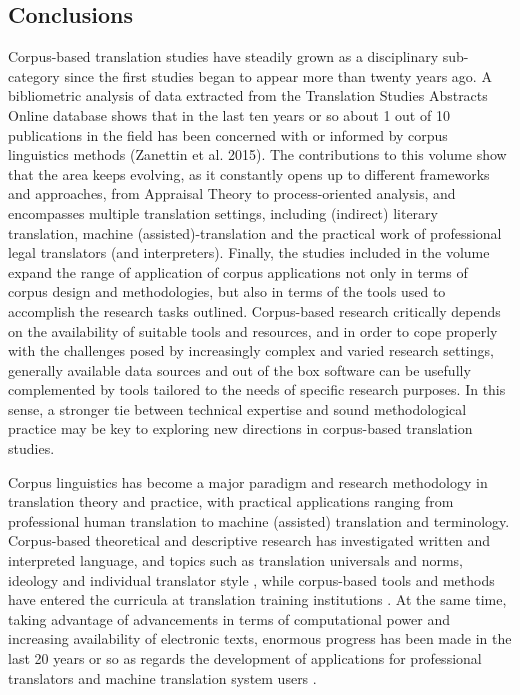 \begin{refsection}
\section{Conclusions}
Corpus-based translation studies have steadily grown as a disciplinary sub-category since the first studies began to appear more than twenty years ago. A bibliometric analysis of data extracted from the Translation Studies Abstracts Online database shows that in the last ten years or so about 1 out of 10 publications in the field has been concerned with or informed by corpus linguistics methods (Zanettin et al. 2015). The contributions to this volume show that the area keeps evolving, as it constantly opens up to different frameworks and approaches, from Appraisal Theory to process-oriented analysis, and encompasses multiple translation settings, including (indirect) literary translation, machine (assisted)-translation and the practical work of professional legal translators (and interpreters). Finally, the studies included in the volume expand the range of application of corpus applications not only in terms of corpus design and methodologies, but also in terms of the tools used to accomplish the research tasks outlined. Corpus-based research critically depends on the availability of suitable tools and resources, and in order to cope properly with the challenges posed by increasingly complex and varied research settings, generally available data sources and out of the box software can be usefully complemented by tools tailored to the needs of specific research purposes. In this sense, a stronger tie between technical expertise and sound methodological practice may be key to exploring new directions in corpus-based translation studies.

Corpus linguistics has become a major paradigm and research methodology in translation theory and practice, with practical applications ranging from professional human translation to machine (assisted) translation and terminology. Corpus-based theoretical and descriptive research has investigated written and interpreted language, and topics such as translation universals and norms, ideology and individual translator style \citep{Laviosa2002, Olohan2004, Zanettin2012}, while corpus-based tools and methods have entered the curricula at translation training institutions \citep{Zanettin2003, Beeby2009}. At the same time, taking advantage of advancements in terms of computational power and increasing availability of electronic texts, enormous progress has been made in the last 20 years or so as regards the development of applications for professional translators and machine translation system users \citep{Coehn2009,Brunette2013}.


\end{refsection}
